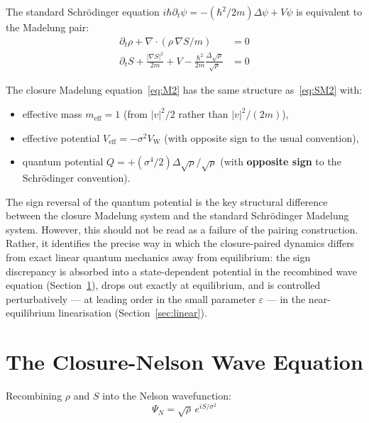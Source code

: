 \documentclass[12pt]{article}
\newcommand{\VW}{V_{\mathrm{W}}}
\begin{document}
The standard Schr\"odinger equation $i\hbar\partial_t\psi = -(\hbar^2/2m)\Delta\psi + V\psi$ is equivalent to the Madelung pair:
\begin{align}
    \partial_t\rho + \nabla\cdot(\rho\,\nabla S/m) &= 0 \label{eq:SM1}\\
    \partial_t S + \frac{|\nabla S|^2}{2m} + V - \frac{\hbar^2}{2m}\frac{\Delta\sqrt\rho}{\sqrt\rho} &= 0 \label{eq:SM2}
\end{align}

The closure Madelung equation~\eqref{eq:M2} has the same structure as~\eqref{eq:SM2} with:
\begin{itemize}
    \item effective mass $m_{\mathrm{eff}} = 1$ (from $|v|^2/2$ rather than $|v|^2/(2m)$),
    \item effective potential $V_{\mathrm{eff}} = -\sigma^2\VW$ (with opposite sign to the usual convention),
    \item quantum potential $Q = +(\sigma^4/2)\Delta\sqrt\rho/\sqrt\rho$ (with \textbf{opposite sign} to the Schr\"odinger convention).
\end{itemize}

The sign reversal of the quantum potential is the key structural difference between the closure Madelung system and the standard Schr\"odinger Madelung system. However, this should not be read as a failure of the pairing construction. Rather, it identifies the precise way in which the closure-paired dynamics differs from exact linear quantum mechanics away from equilibrium: the sign discrepancy is absorbed into a state-dependent potential in the recombined wave equation (Section~\ref{sec:wave}), drops out exactly at equilibrium, and is controlled perturbatively --- at leading order in the small parameter $\varepsilon$ --- in the near-equilibrium linearisation (Section~\ref{sec:linear}).

\section{The Closure-Nelson Wave Equation}\label{sec:wave}

Recombining $\rho$ and $S$ into the Nelson wavefunction:
\begin{equation}\label{eq:nelson_psi}
    \Psi_N = \sqrt{\rho}\, e^{iS/\sigma^2}
\end{equation}
\end{document}
